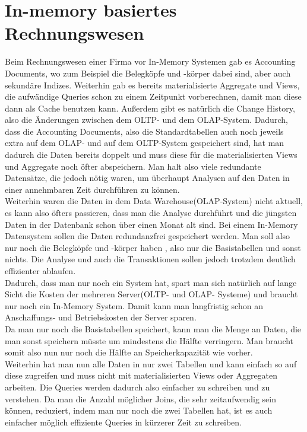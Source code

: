 %
\section{In-memory basiertes Rechnungswesen}
Beim Rechnungswesen einer Firma vor In-Memory Systemen gab es Accounting Documents, wo zum Beispiel die Belegköpfe und -körper dabei sind, aber auch sekundäre Indizes. Weiterhin gab es bereits materialisierte Aggregate und Views, die aufwändige Queries schon zu einem Zeitpunkt vorberechnen, damit man diese dann als Cache benutzen kann. Außerdem gibt es natürlich die Change History, also die Änderungen zwischen dem OLTP- und dem OLAP-System. Dadurch, dass die Accounting Documents, also die Standardtabellen auch noch jeweils extra auf dem OLAP- und auf dem OLTP-System gespeichert sind, hat man dadurch die Daten bereits doppelt und muss diese für die materialisierten Views und Aggregate noch öfter abspeichern. Man halt also viele redundante Datensätze, die jedoch nötig waren, um überhaupt Analysen auf den Daten in einer annehmbaren Zeit durchführen zu können.
\\
Weiterhin waren die Daten in dem Data Warehouse(OLAP-System) nicht aktuell, es kann also öfters passieren, dass man die Analyse durchführt und die jüngsten Daten in der Datenbank schon über einen Monat alt sind.
Bei einem In-Memory Datensystem sollen die Daten redundanzfrei gespeichert werden. Man soll also nur noch die Belegköpfe und -körper haben , also nur die Basistabellen und sonst nichts. Die Analyse und auch die Transaktionen sollen jedoch trotzdem deutlich effizienter ablaufen.
\\
Dadurch, dass man nur noch ein System hat, spart man sich natürlich auf lange Sicht die Kosten der mehreren Server(OLTP- und OLAP- Systeme) und braucht nur noch ein In-Memory System. Damit kann man langfristig schon an Anschaffungs- und Betriebskosten der Server sparen.
\\
Da man nur noch die Basistabellen speichert, kann man die Menge an Daten, die man sonst speichern müsste um mindestens die Hälfte verringern. Man braucht somit also nun nur noch die Hälfte an Speicherkapazität wie vorher.
\\
Weiterhin hat man nun alle Daten in nur zwei Tabellen und kann einfach so auf diese zugreifen und muss nicht mit materialisierten Views oder Aggregaten arbeiten. Die Queries werden dadurch also einfacher zu schreiben und zu verstehen. Da man die Anzahl möglicher Joins, die sehr zeitaufwendig sein können, reduziert, indem man nur noch die zwei Tabellen hat, ist es auch einfacher möglich effiziente Queries in kürzerer Zeit zu schreiben.
